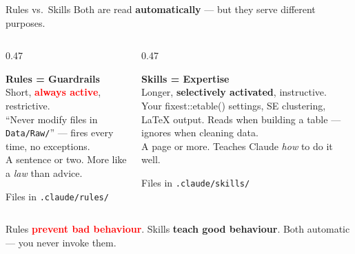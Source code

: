\documentclass[aspectratio=169, 11pt]{beamer}
\newcommand{\emphgold}[1]{\alert{\textbf{#1}}}
\newcommand{\emphcoral}[1]{\textcolor{red}{\textbf{#1}}}
\newcommand{\emphsage}[1]{\textcolor{green!60!black}{\textbf{#1}}}
\begin{document}
\begin{frame}{Rules vs.\ Skills}
{\small Both are read \emphgold{automatically} --- but they serve different purposes.}

\vspace{0.05cm}
\begin{columns}[T]
\begin{column}{0.47\textwidth}
  \begin{tcolorbox}[
    enhanced, colback=coral!6, colframe=coral!50, boxrule=0.5pt,
    sharp corners, left=8pt, right=8pt, top=4pt, bottom=4pt,
  ]
    {\small\bfseries\color{navy} Rules = Guardrails}\\[2pt]
    {\scriptsize Short, \emphcoral{always active}, restrictive.}\\[2pt]
    {\scriptsize ``Never modify files in \texttt{Data/Raw/}'' --- fires every time, no exceptions.}\\[2pt]
    {\scriptsize\color{slate} A sentence or two. More like a \emph{law} than advice.}
  \end{tcolorbox}
  {\scriptsize\color{slate} Files in \texttt{.claude/rules/}}
\end{column}
\begin{column}{0.47\textwidth}
  \begin{tcolorbox}[
    enhanced, colback=sage!8, colframe=sage!50, boxrule=0.5pt,
    sharp corners, left=8pt, right=8pt, top=4pt, bottom=4pt,
  ]
    {\small\bfseries\color{navy} Skills = Expertise}\\[2pt]
    {\scriptsize Longer, \emphsage{selectively activated}, instructive.}\\[2pt]
    {\scriptsize Your fixest::etable() settings, SE clustering, \LaTeX{} output. Reads when building a table --- ignores when cleaning data.}\\[2pt]
    {\scriptsize\color{slate} A page or more. Teaches Claude \emph{how} to do it well.}
  \end{tcolorbox}
  {\scriptsize\color{slate} Files in \texttt{.claude/skills/}}
\end{column}
\end{columns}

\vspace{0.05cm}
\begin{keyinsight}
  {\small Rules \emphcoral{prevent bad behaviour}. Skills \emphsage{teach good behaviour}. Both automatic --- you never invoke them.}
\end{keyinsight}
\end{frame}
\end{document}
